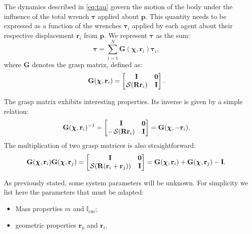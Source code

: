 The dynamics described in \eqref{eq:tau} govern the motion of the body under the influence of the total wrench $\boldsymbol{\tau}$ applied about $\mathbf{p}$. This quantity needs to be expressed as a function of the wrenches $\boldsymbol{\tau}_i$ applied by each agent about their respective displacement $\mathbf{r}_i$ from $\mathbf{p}$. We represent $\boldsymbol{\tau}$ as the sum:
\begin{equation}
    \boldsymbol{\tau} = \sum_{i=1}^N\mathbf{G}(\boldsymbol{\chi}, \mathbf{r}_i)\boldsymbol{\tau}_i, \label{eq:tauNtauIrelation}
\end{equation}
where $\mathbf{G}$ denotes the grasp matrix, defined as:
\begin{equation}
    \mathbf{G}(\boldsymbol{\chi}, \mathbf{r}_i) = \begin{bmatrix}
        \mathbf{I} & \mathbf{0} \\
        \SL[\mathbf{R}\mathbf{r}_i] & \mathbf{I}
    \end{bmatrix}. \label{eq:graspmatrix}
\end{equation}

The grasp matrix exhibits interesting properties. Its inverse is given by a simple relation:
\begin{align}
    \mathbf{G}(\boldsymbol{\chi}, \mathbf{r}_i)^{-1} = \begin{bmatrix}
        \mathbf{I} & \mathbf{0} \\
        -\SL[\mathbf{R}\mathbf{r}_i] & \mathbf{I}
    \end{bmatrix} = \mathbf{G}(\boldsymbol{\chi}, -\mathbf{r}_i).
\end{align}
The multiplication of two grasp matrices is also straightforward:
\begin{align}
    \mathbf{G}(\boldsymbol{\chi}, \mathbf{r}_i)\mathbf{G}(\boldsymbol{\chi}, \mathbf{r}_j) =
    \begin{bmatrix}
        \mathbf{I} & \mathbf{0} \\
        \SL[\mathbf{R}(\mathbf{r}_i + \mathbf{r}_j)] & \mathbf{I}
    \end{bmatrix} = \mathbf{G}(\boldsymbol{\chi}, \mathbf{r}_i) + \mathbf{G}(\boldsymbol{\chi}, \mathbf{r}_j) - \mathbf{I}.
\end{align}

As previously stated, some system parameters will be unknown. For simplicity we list here the parameters that must be adapted:
\begin{itemize}
    \item Mass properties $m$ and $\mathbb{I}_\text{cm}$;
    \item geometric properties $\mathbf{r}_p$ and $\mathbf{r}_i$.
\end{itemize}

